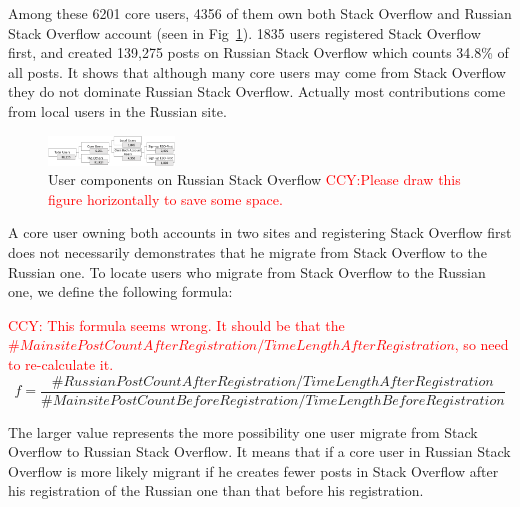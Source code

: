 Among these 6201 core users, 4356 of them own both Stack Overflow and Russian Stack Overflow account (seen in Fig~\ref{fig:reputationTree}). 
1835 users registered Stack Overflow first, and created 139,275 posts on Russian Stack Overflow which counts 34.8\% of all posts.
It shows that although many core users may come from Stack Overflow they do not dominate Russian Stack Overflow.
Actually most contributions come from local users in the Russian site.

\begin{figure}
	\centering
	\includegraphics[width = 0.3\textwidth]{figures/usercomponent.png}
	\caption{User components on Russian Stack Overflow \textcolor{red}{CCY:Please draw this figure horizontally to save some space.}}
	\centering
	\label{fig:reputationTree}
\end{figure}

A core user owning both accounts in two sites and registering Stack Overflow first does not necessarily demonstrates that he migrate from Stack Overflow to the Russian one.
To locate users who migrate from Stack Overflow to the Russian one, we define the following formula: 

\textcolor{red}{CCY: This formula seems wrong. It should be that the $\#MainsitePostCountAfterRegistration/TimeLengthAfterRegistration$, so need to re-calculate it.}
\begin{equation}
	f = \frac{\#RussianPostCountAfterRegistration/TimeLengthAfterRegistration}{  \#MainsitePostCountBeforeRegistration /TimeLengthBeforeRegistration}	 
	\label{equ:active}
\end{equation}

The larger value represents the more possibility one user migrate from Stack Overflow to Russian Stack Overflow.
It means that if a core user in Russian Stack Overflow is more likely migrant if he creates fewer posts in Stack Overflow after his registration of the Russian one than that before his registration.

